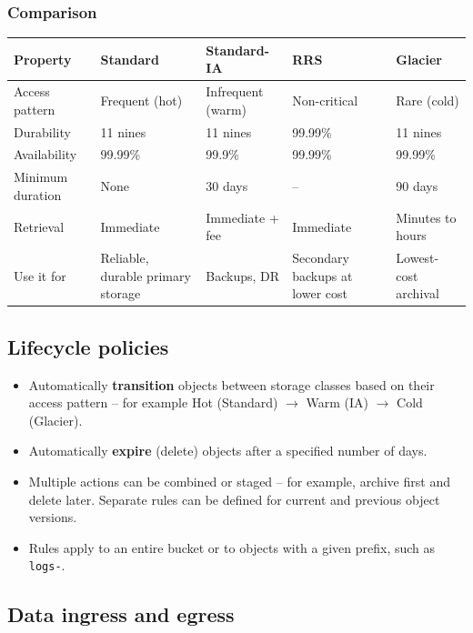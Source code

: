 \documentclass[11pt,a4paper]{article}
\begin{document}
\subsubsection{Comparison}

\begin{tabularx}{\textwidth}{@{}lXXXX@{}}
\toprule
\rowcolor{tablehead}\textbf{Property} & \textbf{Standard} & \textbf{Standard-IA} &
  \textbf{RRS} & \textbf{Glacier} \\
\midrule
Access pattern & Frequent (hot) & Infrequent (warm) & Non-critical & Rare (cold) \\
Durability & 11 nines & 11 nines & 99.99\% & 11 nines \\
Availability & 99.99\% & 99.9\% & 99.99\% & 99.99\% \\
Minimum duration & None & 30 days & -- & 90 days \\
Retrieval & Immediate & Immediate + fee & Immediate & Minutes to hours \\
Use it for & Reliable, durable primary storage & Backups, DR & Secondary backups at lower
  cost & Lowest-cost archival \\
\bottomrule
\end{tabularx}

\subsection{Lifecycle policies}

\begin{itemize}\itemsep2pt
  \item Automatically \textbf{transition} objects between storage classes based on their
        access pattern -- for example Hot (Standard) $\rightarrow$ Warm (IA) $\rightarrow$
        Cold (Glacier).
  \item Automatically \textbf{expire} (delete) objects after a specified number of days.
  \item Multiple actions can be combined or staged -- for example, archive first and delete
        later. Separate rules can be defined for current and previous object versions.
  \item Rules apply to an entire bucket or to objects with a given prefix, such as
        \texttt{logs-}.
\end{itemize}


\subsection{Data ingress and egress}
\end{document}
